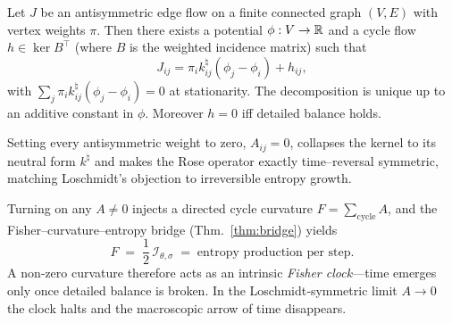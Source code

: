 		\begin{lemma}\label{lem:graph-Helmholtz}
			Let $J$ be an antisymmetric edge flow on a finite connected graph
			$(V,E)$ with vertex weights $\pi$.
			Then there exists a potential $\phi:V\to\mathbb{R}$ and a cycle flow
			$h\in \ker B^{\top}$ (where $B$ is the weighted incidence matrix)
			such that
			\[
  				J_{ij} = \pi_i k^{\natural}_{ij}(\phi_j-\phi_i) + h_{ij},
			\]
			with $\sum_{j} \pi_i k^{\natural}_{ij}(\phi_j-\phi_i)=0$ at stationarity.
			The decomposition is unique up to an additive constant in $\phi$.
			Moreover $h=0$ iff detailed balance holds.
		\end{lemma}
	
		\begin{remark}
 			Setting every antisymmetric weight to zero, $A_{ij}=0$, collapses the
 			kernel to its neutral form $k^{\natural}$ and makes the Rose operator
  			exactly time–reversal symmetric, matching Loschmidt’s objection to
  			irreversible entropy growth.

  			Turning on any $A\neq0$ injects a directed cycle curvature
  			$F=\sum_{\text{cycle}}A$, and the Fisher–curvature–entropy bridge
  			(Thm.~\ref{thm:bridge}) yields
 			 \[
     				F \;=\; \frac{1}{2}\,\mathcal I_{\theta,\sigma}\;=\; \text{entropy production per step}.
  			\]
  			A non‑zero curvature therefore acts as an intrinsic \emph{Fisher
  			clock}—time emerges only once detailed balance is broken.  In the
  			Loschmidt‑symmetric limit $A\!\to\!0$ the clock halts and the macroscopic
  			arrow of time disappears.
		\end{remark}